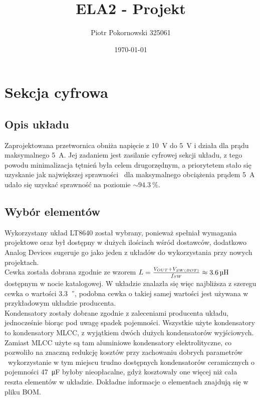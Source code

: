 \documentclass{article}
\title{ELA2 - Projekt}
\author{Piotr Pokornowski 325061}
\date{\today}
\begin{document}
\maketitle

\newpage

\section{Sekcja cyfrowa}
\subsection{Opis układu}
Zaprojektowana przetwornica obniża napięcie z \SI{10}{\V} do \SI{5}{\V} i działa dla prądu maksymalnego \SI{5}{\A}. Jej zadaniem jest zasilanie cyfrowej sekcji układu, z tego powodu minimalizacja tętnień była celem drugorzędnym, a priorytetem stało się uzyskanie jak największej sprawności \textemdash \ dla maksymalnego obciążenia prądem \SI{5}{\A} udało się uzyskać sprawność na poziomie $\sim \SI{94.3}{\percent}$.

\begin{figure}[H]
    \centering
    \begin{adjustbox}{width=1.1\textwidth,center}
        \qquad
    \end{adjustbox}
\end{figure}

\subsection{Wybór elementów}
Wykorzystany układ LT8640 został wybrany, ponieważ spełniał wymagania projektowe oraz był dostępny w dużych ilościach wśród dostawców, dodatkowo Analog Devices sugeruje go jako jeden z układów do wykorzystania przy nowych projektach.\\
Cewka została dobrana zgodnie ze wzorem $L = \frac{V_{OUT} + V_{SW(BOT)}}{f_{SW}} \approx \SI{3.6}{\micro\H}$ dostępnym w nocie katalogowej. W układzie znalazła się więc najbliższa z szeregu cewka o wartości \SI{3.3}{\micro\H}, podobna cewka o takiej samej wartości jest używana w przykładowym układzie producenta.\\
Kondensatory zostały dobrane zgodnie z zaleceniami producenta układu, jednocześnie biorąc pod uwagę spadek pojemności. Wszystkie użyte kondensatory to kondensatory MLCC, z wyjątkiem dwóch dużych kondensatorów wyjściowych. Zamiast MLCC użyte są tam aluminiowe kondensatory elektrolityczne, co pozwoliło na znaczną redukcję kosztów przy zachowaniu dobrych parametrów \textemdash \ wykorzystanie w tym miejscu trudno dostępnych kondensatorów ceramicznych o pojemności \SI{47}{\micro\F} byłoby nieopłacalne, gdyż kosztowały one więcej niż cała reszta elementów w układzie. Dokładne informacje o elementach znajdują się w pliku BOM.
\end{document}

